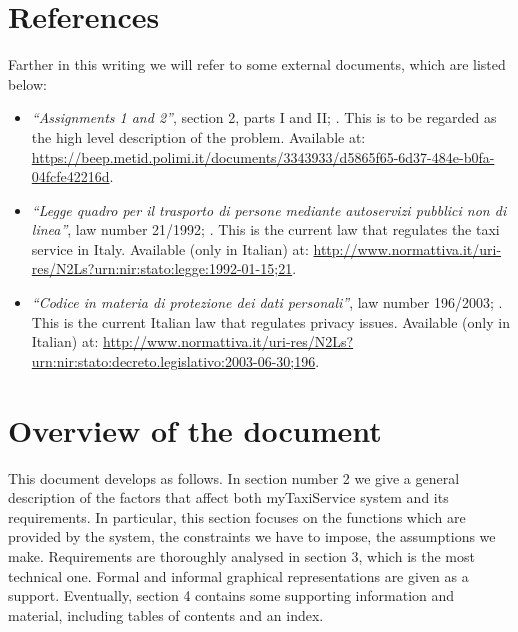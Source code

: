 \section{References}\label{sec:references}	
Farther in this writing we will refer to some external documents, which are listed below:
\begin{itemize}
	\item \emph{``Assignments 1 and 2''}, section 2, parts I and II; . This is to be regarded as the high level description of the problem. Available at: \url{https://beep.metid.polimi.it/documents/3343933/d5865f65-6d37-484e-b0fa-04fcfe42216d}.
	\item \emph{``Legge quadro per il trasporto di persone mediante autoservizi pubblici non di linea''}, law number 21/1992; . This is the current law that regulates the taxi service in Italy. Available (only in Italian) at: \url{http://www.normattiva.it/uri-res/N2Ls?urn:nir:stato:legge:1992-01-15;21}.
	\item \emph{``Codice in materia di protezione dei dati personali''}, law number 196/2003; . This is the current Italian law that regulates privacy issues. Available (only in Italian) at: \url{http://www.normattiva.it/uri-res/N2Ls?urn:nir:stato:decreto.legislativo:2003-06-30;196}.
\end{itemize}


\section{Overview of the document}	
This document develops as follows. In section number 2 we give a general description of the factors that affect both myTaxiService system and its requirements. In particular, this section focuses on the functions which are provided by the system, the constraints we have to impose, the assumptions we make. Requirements are thoroughly analysed in section 3, which is the most technical one. Formal and informal graphical representations are given as a support. Eventually, section 4 contains some supporting information and material, including tables of contents and an index.



